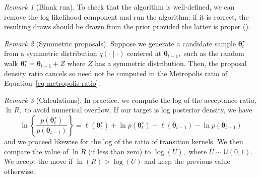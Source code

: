 \documentclass[
  11pt,
  letterpaper,
]{scrbook}
\theoremstyle{definition}
\theoremstyle{plain}
\theoremstyle{plain}
\theoremstyle{plain}
\theoremstyle{definition}
\theoremstyle{definition}
\theoremstyle{plain}
\theoremstyle{plain}
\theoremstyle{remark}
\newtheorem*{remark}{Remark}
\begin{document}
\begin{remark}[Blank run]
To check that the algorithm is well-defined, we can remove the log
likelihood component and run the algorithm: if it is correct, the
resulting draws should be drawn from the prior provided the latter is
proper ().
\end{remark}

\begin{remark}[Symmetric proposals]
Suppose we generate a candidate sample \(\boldsymbol{\theta}_t^{\star}\)
from a symmetric distribution \(q(\cdot \mid \cdot)\) centered at
\(\boldsymbol{\theta}_{t-1},\) such as the random walk
\(\boldsymbol{\theta}_t^{\star} =\boldsymbol{\theta}_{t-1}+ Z\) where
\(Z\) has a symmetric distribution. Then, the proposal density ratio
cancels so need not be computed in the Metropolis ratio of
Equation~\ref{eq-metropolis-ratio}.
\end{remark}

\begin{remark}[Calculations]
In practice, we compute the log of the acceptance ratio, \(\ln R,\) to
avoid numerical overflow. If our target is log posterior density, we
have \[
\ln \left\{\frac{p(\boldsymbol{\theta}_t^{\star})}{p(\boldsymbol{\theta}_{t-1})}\right\} = \ell(\boldsymbol{\theta}_t^{\star}) + \ln p(\boldsymbol{\theta}_t^{\star}) - \ell(\boldsymbol{\theta}_{t-1}) - \ln p(\boldsymbol{\theta}_{t-1}) 
\] and we proceed likewise for the log of the ratio of transition
kernels. We then compare the value of \(\ln R\) (if less than zero) to
\(\log(U),\) where \(U \sim \mathsf{U}(0,1).\) We accept the move if
\(\ln(R) >\log(U)\) and keep the previous value otherwise.
\end{remark}
\end{document}
